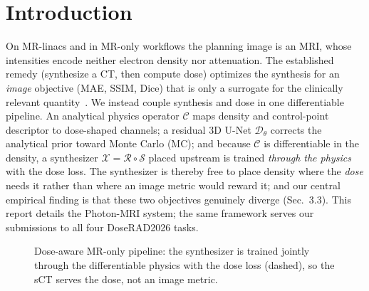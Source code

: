\documentclass{llncs}
\newcommand{\opS}{\mathcal{S}}\newcommand{\opD}{\mathcal{D}}\newcommand{\opX}{\mathcal{X}}
\newcommand{\opR}{\mathcal{R}}\newcommand{\opC}{\mathcal{C}}\newcommand{\gam}{\gamma}
\begin{document}
\section{Introduction}
On MR-linacs and in MR-only workflows the planning image is an MRI, whose intensities encode
neither electron density nor attenuation. The established remedy (synthesize a CT, then compute
dose) optimizes the synthesis for an \emph{image} objective (MAE, SSIM, Dice) that is only a
surrogate for the clinically relevant quantity~\cite{mriproton,rsp,liver,ganbrain,uncert,dect}.
We instead couple synthesis and dose in one differentiable pipeline. An analytical physics
operator $\opC$ maps density and control-point descriptor to dose-shaped channels; a residual 3D
U-Net $\opD_\theta$ corrects the analytical prior toward Monte Carlo (MC); and because $\opC$ is
differentiable in the density, a synthesizer $\opX=\opR\circ\opS$ placed upstream is trained
\emph{through the physics} with the dose loss. The synthesizer is thereby free to place density
where the \emph{dose} needs it rather than where an image metric would reward it; and our
central empirical finding is that these two objectives genuinely diverge (Sec.~3.3). This report
details the Photon-MRI system; the same framework serves our submissions to all four DoseRAD2026
tasks.

\begin{figure}[t]\centering
{}
\caption{Dose-aware MR-only pipeline: the synthesizer is trained jointly through the
differentiable physics with the dose loss (dashed), so the sCT serves the dose, not an image
metric.}\label{fig:framework}
\end{figure}
\end{document}
